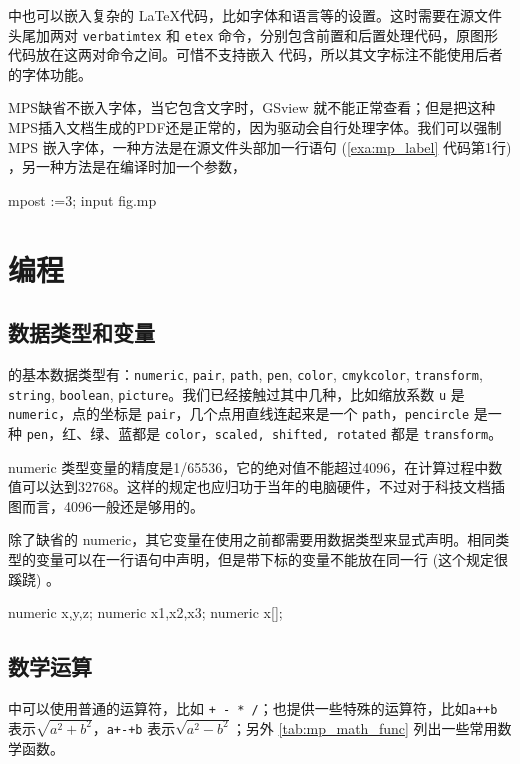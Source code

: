 \MP 中也可以嵌入复杂的 \LaTeX 代码，比如字体和语言等的设置。这时需要在源文件头尾加两对 \texttt{verbatimtex} 和 \texttt{etex} 命令，分别包含前置和后置处理代码，原图形代码放在这两对命令之间。可惜\MP 不支持嵌入 \XeLaTeX 代码，所以其文字标注不能使用后者的字体功能。

MPS缺省不嵌入字体，当它包含文字时，GSview 就不能正常查看；但是把这种MPS插入文档生成的PDF还是正常的，因为驱动会自行处理字体。我们可以强制 MPS 嵌入字体，一种方法是在源文件头部加一行语句 (\autoref{exa:mp_label} 代码第1行) ，另一种方法是在编译时加一个参数，

\begin{Code}[]
mpost \prologues:=3; input fig.mp
\end{Code}

\section{编程}
\subsection{数据类型和变量}

\MP 的基本数据类型有：\texttt{numeric}, \texttt{pair}, \texttt{path}, \texttt{pen}, \texttt{color}, \texttt{cmykcolor}, \texttt{transform}, \texttt{string}, \texttt{boolean}, \texttt{picture}。我们已经接触过其中几种，比如缩放系数 \texttt{u} 是 \texttt{numeric}，点的坐标是 \texttt{pair}，几个点用直线连起来是一个 \texttt{path}，\texttt{pencircle} 是一种 \texttt{pen}，红、绿、蓝都是 \texttt{color}，\texttt{scaled, shifted, rotated} 都是 \texttt{transform}。

numeric 类型变量的精度是1/65536，它的绝对值不能超过4096，在计算过程中数值可以达到32768。这样的规定也应归功于当年的电脑硬件，不过对于科技文档插图而言，4096一般还是够用的。

除了缺省的 numeric，其它变量在使用之前都需要用数据类型来显式声明。相同类型的变量可以在一行语句中声明，但是带下标的变量不能放在同一行 (这个规定很蹊跷) 。

\begin{Code}
numeric x,y,z;    %
numeric x1,x2,x3; %
numeric x[];      %
\end{Code}

\subsection{数学运算}

\MP 中可以使用普通的运算符，比如 \verb|+ - * /|；也提供一些特殊的运算符，比如\verb|a++b| 表示$\sqrt{a^2+b^2}$，\verb|a+-+b| 表示$\sqrt{a^2-b^2}$；另外 \autoref{tab:mp_math_func} 列出一些常用数学函数。

